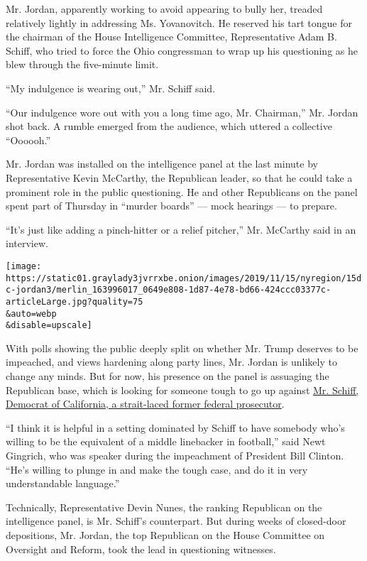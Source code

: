 Mr. Jordan, apparently working to avoid appearing to bully her, treaded
relatively lightly in addressing Ms. Yovanovitch. He reserved his tart
tongue for the chairman of the House Intelligence Committee,
Representative Adam B. Schiff, who tried to force the Ohio congressman
to wrap up his questioning as he blew through the five-minute limit.

``My indulgence is wearing out,'' Mr. Schiff said.

``Our indulgence wore out with you a long time ago, Mr. Chairman,'' Mr.
Jordan shot back. A rumble emerged from the audience, which uttered a
collective ``Oooooh.''

Mr. Jordan was installed on the intelligence panel at the last minute by
Representative Kevin McCarthy, the Republican leader, so that he could
take a prominent role in the public questioning. He and other
Republicans on the panel spent part of Thursday in ``murder boards'' ---
mock hearings --- to prepare.

``It's just like adding a pinch-hitter or a relief pitcher,'' Mr.
McCarthy said in an interview.

\texttt{[image: https://static01.graylady3jvrrxbe.onion/images/2019/11/15/nyregion/15dc-jordan3/merlin\_163996017\_0649e808-1d87-4e78-bd66-424ccc03377c-articleLarge.jpg?quality=75\\\&auto=webp\\\&disable=upscale]}

With polls showing the public deeply split on whether Mr. Trump deserves
to be impeached, and views hardening along party lines, Mr. Jordan is
unlikely to change any minds. But for now, his presence on the panel is
assuaging the Republican base, which is looking for someone tough to go
up against
\href{https://www.nytimes3xbfgragh.onion/2019/11/03/us/politics/adam-schiff-trump-impeachment.html}{Mr.
Schiff, Democrat of California, a strait-laced former federal
prosecutor}.

``I think it is helpful in a setting dominated by Schiff to have
somebody who's willing to be the equivalent of a middle linebacker in
football,'' said Newt Gingrich, who was speaker during the impeachment
of President Bill Clinton. ``He's willing to plunge in and make the
tough case, and do it in very understandable language.''

Technically, Representative Devin Nunes, the ranking Republican on the
intelligence panel, is Mr. Schiff's counterpart. But during weeks of
closed-door depositions, Mr. Jordan, the top Republican on the House
Committee on Oversight and Reform, took the lead in questioning
witnesses.

